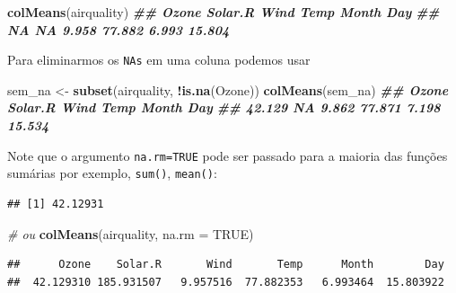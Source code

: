 \documentclass[
]{book}
\newenvironment{Shaded}{\begin{snugshade}}{\end{snugshade}}
\newcommand{\AttributeTok}[1]{\textcolor[rgb]{0.13,0.29,0.53}{#1}}
\newcommand{\CommentTok}[1]{\textcolor[rgb]{0.56,0.35,0.01}{\textit{#1}}}
\newcommand{\ConstantTok}[1]{\textcolor[rgb]{0.56,0.35,0.01}{#1}}
\newcommand{\DocumentationTok}[1]{\textcolor[rgb]{0.56,0.35,0.01}{\textbf{\textit{#1}}}}
\newcommand{\FunctionTok}[1]{\textcolor[rgb]{0.13,0.29,0.53}{\textbf{#1}}}
\newcommand{\NormalTok}[1]{#1}
\newcommand{\OtherTok}[1]{\textcolor[rgb]{0.56,0.35,0.01}{#1}}
\newcommand{\SpecialCharTok}[1]{\textcolor[rgb]{0.81,0.36,0.00}{\textbf{#1}}}
\begin{document}
\begin{Shaded}
\begin{Highlighting}[]
\FunctionTok{colMeans}\NormalTok{(airquality)}
\DocumentationTok{\#\#   Ozone Solar.R    Wind    Temp   Month     Day }
\DocumentationTok{\#\#      NA      NA   9.958  77.882   6.993  15.804}
\end{Highlighting}
\end{Shaded}

Para eliminarmos os \texttt{NAs} em uma coluna podemos usar

\begin{Shaded}
\begin{Highlighting}[]
\NormalTok{sem\_na }\OtherTok{\textless{}{-}} \FunctionTok{subset}\NormalTok{(airquality, }\SpecialCharTok{!}\FunctionTok{is.na}\NormalTok{(Ozone))}
\FunctionTok{colMeans}\NormalTok{(sem\_na)}
\DocumentationTok{\#\#   Ozone Solar.R    Wind    Temp   Month     Day }
\DocumentationTok{\#\#  42.129      NA   9.862  77.871   7.198  15.534}
\end{Highlighting}
\end{Shaded}

Note que o argumento \texttt{na.rm=TRUE} pode ser passado para a maioria das
funções sumárias por exemplo, \texttt{sum()}, \texttt{mean()}:

\begin{Shaded}
\end{Shaded}

\begin{verbatim}
## [1] 42.12931
\end{verbatim}

\begin{Shaded}
\begin{Highlighting}[]
\CommentTok{\# ou}
\FunctionTok{colMeans}\NormalTok{(airquality, }\AttributeTok{na.rm =} \ConstantTok{TRUE}\NormalTok{)}
\end{Highlighting}
\end{Shaded}

\begin{verbatim}
##      Ozone    Solar.R       Wind       Temp      Month        Day 
##  42.129310 185.931507   9.957516  77.882353   6.993464  15.803922
\end{verbatim}
\end{document}
